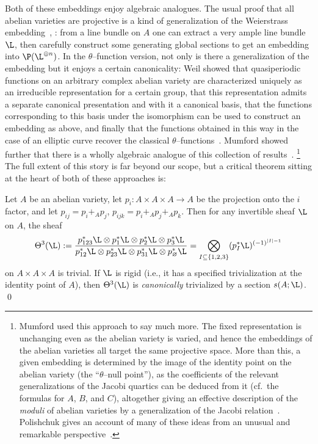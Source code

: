 Both of these embeddings enjoy algebraic analogues.
The usual proof that all abelian varieties are projective is a kind of generalization of the Weierstrass embedding~\cite[Section I.6]{Milne}, \cite[Remark II.7.8.2]{Hartshorne}: from a line bundle on \(A\) one can extract a very ample line bundle \(\L\), then carefully construct some generating global sections to get an embedding into \(\P(\L^{\oplus n})\).
In the \(\theta\)--function version, not only is there a generalization of the embedding but it enjoys a certain canonicality: Weil showed that quasiperiodic functions on an arbitrary complex abelian variety are characterized uniquely as an irreducible representation for a certain group, that this representation admits a separate canonical presentation and with it a canonical basis, that the functions corresponding to this basis under the isomorphism can be used to construct an embedding as above, and finally that the functions obtained in this way in the case of an elliptic curve recover the classical $\theta$--functions~\cite{WeilTheta,Cartier}.
Mumford showed further that there is a wholly algebraic analogue of this collection of results~\cite{MumfordEquationsI,Tate}.%
\footnote{%
Mumford used this approach to say much more.
The fixed representation is unchanging even as the abelian variety is varied, and hence the embeddings of the abelian varieties all target the same projective space.
More than this, a given embedding is determined by the image of the identity point on the abelian variety (the ``$\theta$--null point''), as the coefficients of the relevant generalizations of the Jacobi quartics can be deduced from it (cf.\ the formulas for $A$, $B$, and $C$), altogether giving an effective description of the \emph{moduli} of abelian varieties by a generalization of the Jacobi relation~\cite{MumfordEquationsII,MumfordEquationsIII}.
Polishchuk gives an account of many of these ideas from an unusual and remarkable perspective~\cite{Polishchuk}.
}
The full extent of this story is far beyond our scope, but a critical theorem sitting at the heart of both of these approaches is:
\begin{theorem}\label{Theta3IsTrivial}
Let \(A\) be an abelian variety, let \(p_i: A \times A \times A \to A\) be the projection onto the \(i\){\th} factor, and let \(p_{ij} = p_i +_A p_j\), \(p_{ijk} = p_i +_A p_j +_A p_k\).
Then for any invertible sheaf \(\L\) on \(A\), the sheaf \[\Theta^3(\L) := \frac{p_{123}^* \L \otimes p_1^* \L \otimes p_2^* \L \otimes p_3^* \L}{p_{12}^* \L \otimes p_{23}^* \L \otimes p_{31}^* \L \otimes p_\emptyset^* \L} = \bigotimes_{I \subseteq \{1, 2, 3\}} (p_I^* \L)^{(-1)^{|I| - 1}}\] on \(A \times A \times A\) is trivial.
If \(\L\) is rigid (i.e., it has a specified trivialization at the identity point of \(A\)), then \(\Theta^3(\L)\) is \emph{canonically} trivialized by a section \(s(A; \L)\). \qed
\end{theorem}

